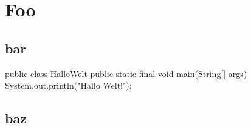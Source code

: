 \documentclass[utf,compactfonts]{uhb-inf-tex}
\begin{document}
\section{Foo}
\blindtext[1]
\subsection{bar}
\blindtext[1]
\begin{Java}
	public class HalloWelt {
		public static final void main(String[] args) {
			System.out.println("Hallo Welt!");
		}
	}
\end{Java}

\subsection{baz}
\blinditemize
\blindtext[1]
\end{document}
